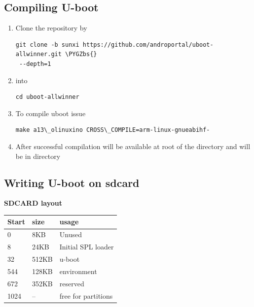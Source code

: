 \documentclass[letterpaper,10pt,english]{sphinxmanual}
\def\PYGZbs{\char`\\}
\begin{document}
\subsection{Compiling U-boot}
\label{embedded-linux:compiling-u-boot}\begin{enumerate}
\item {} 
Clone the repository by

\begin{Verbatim}[commandchars=\\\{\}]
git clone -b sunxi https://github.com/androportal/uboot-allwinner.git \PYGZbs{}
 --depth=1
\end{Verbatim}

\item {} 
 into 

\begin{Verbatim}[commandchars=\\\{\}]
cd uboot-allwinner
\end{Verbatim}

\item {} 
To compile uboot issue

\begin{Verbatim}[commandchars=\\\{\}]
make a13\_olinuxino CROSS\_COMPILE=arm-linux-gnueabihf-
\end{Verbatim}

\item {} 
After successful compilation  will be available at root of the
directory and  will be in  directory

\end{enumerate}

\begin{DUlineblock}{0em}
\item[] 
\end{DUlineblock}


\subsection{Writing U-boot on sdcard}
\label{embedded-linux:writing-u-boot-on-sdcard}
\textbf{SDCARD layout}

\begin{tabulary}{\linewidth}{|L|L|L|}
\hline
\textbf{
Start
} & \textbf{
size
} & \textbf{
usage
}\\\hline

0
 & 
8KB
 & 
Unused
\\\hline

8
 & 
24KB
 & 
Initial SPL loader
\\\hline

32
 & 
512KB
 & 
u-boot
\\\hline

544
 & 
128KB
 & 
environment
\\\hline

672
 & 
352KB
 & 
reserved
\\\hline

1024
 & 
--
 & 
free for partitions
\\\hline
\end{tabulary}
\end{document}
